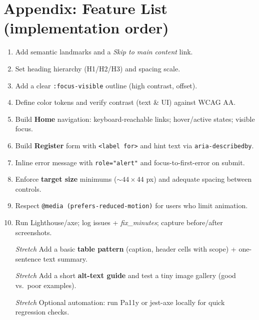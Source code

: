 \documentclass[12pt]{article}
\begin{document}
\section*{Appendix: Feature List (implementation order)}
\begin{enumerate}
  \item Add semantic landmarks and a \emph{Skip to main content} link.
  \item Set heading hierarchy (H1/H2/H3) and spacing scale.
  \item Add a clear \texttt{:focus-visible} outline (high contrast, offset).
  \item Define color tokens and verify contrast (text \& UI) against WCAG AA.
  \item Build \textbf{Home} navigation: keyboard-reachable links; hover/active states; visible focus.
  \item Build \textbf{Register} form with \texttt{<label for>} and hint text via \texttt{aria-describedby}.
  \item Inline error message with \texttt{role="alert"} and focus-to-first-error on submit.
  \item Enforce \textbf{target size} minimums ($\sim 44\times 44$ px) and adequate spacing between controls.
  \item Respect \texttt{@media (prefers-reduced-motion)} for users who limit animation.
  \item Run Lighthouse/axe; log issues + \emph{fix\_minutes}; capture before/after screenshots.
  \item[\textit{Stretch}] Add a basic \textbf{table pattern} (caption, header cells with scope) + one-sentence text summary.
  \item[\textit{Stretch}] Add a short \textbf{alt-text guide} and test a tiny image gallery (good vs.\ poor examples).
  \item[\textit{Stretch}] Optional automation: run Pa11y or jest-axe locally for quick regression checks.
\end{enumerate}

\clearpage


\end{document}
